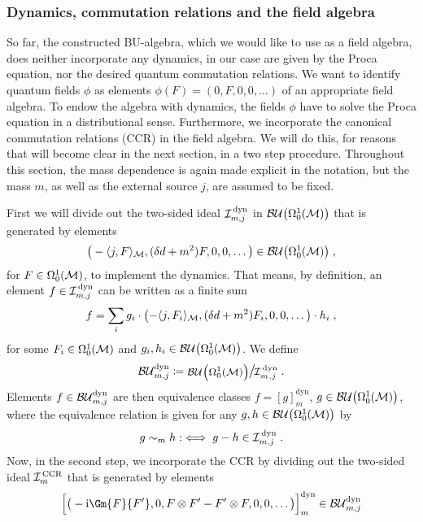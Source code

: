 \subsubsection{Dynamics, commutation relations and the field algebra}
So far, the constructed BU-algebra, which we would like to use as a field algebra, does neither incorporate any dynamics, in our case are given by the Proca equation, nor the desired quantum commutation relations. We want to identify quantum fields $\phi$ as elements $\phi(F) = (0, F, 0, 0, \dots)$ of an appropriate field algebra. To endow the algebra with dynamics,  the fields $\phi$ have to solve the Proca equation in a distributional sense. Furthermore, we incorporate the canonical commutation relations (CCR) in the field algebra. We will do this, for reasons that will become clear in the next section, in a two step procedure. Throughout this section, the mass dependence is again made explicit in the notation, but the mass $m$, as well as the external source $j$, are assumed to be fixed.\par
First we will divide out the two-sided ideal $\mathcal{I}_{m,j}^\text{\,dyn}$ in ${\mathcal{BU}\big(\Omega^1_0(\mathcal{M})\big)}$ that is generated by elements
\begin{align}
\big(-\langle j, F \rangle_{\mathcal{M}}, (\delta d + m^2)F,0,0,\dots\big) \in {\mathcal{BU}\big(\Omega^1_0(\ensuremath{\mathcal{M}})\big)}\;,
\end{align}
for $F \in \Omega^1_0(\mathcal{M})$, to implement the dynamics. That means, by definition, an element $f \in \mathcal{I}_{m,j}^\text{\,dyn}$ can be written as a finite sum
\begin{align}
f = \sum_i g_i \cdot \left(-\langle j, F_i \rangle_{\mathcal{M}}, (\delta d + m^2)F_i,0,0,\dots\right) \cdot h_i \;,
\end{align}
for some $F_i \in \Omega^1_0(\mathcal{M})$ and $g_i, h_i \in {\mathcal{BU}\big(\Omega^1_0(\ensuremath{\mathcal{M}})\big)}$. We define
\begin{align}
	\BUmjdyn \coloneqq {\Quotientscale{\BUOmega}{\IMJDYN}} \formspace.
\end{align}
Elements $f \in \mathcal{BU}_{m,j}^\text{dyn}$ are then equivalence classes $ f = \left[ g \right]_m^\text{dyn}$, $g \in {\mathcal{BU}\big(\Omega^1_0(\ensuremath{\mathcal{M}})\big)}$, where the equivalence relation is given for any $g,h \in {\mathcal{BU}\big(\Omega^1_0(\ensuremath{\mathcal{M}})\big)}$ by
\begin{align}
g \sim_m h :\iff g-h \in \mathcal{I}_{m,j}^\text{\,dyn} \;.
\end{align}
Now, in the second step, we incorporate the CCR by dividing out the two-sided ideal $\mathcal{I}_m^\text{\,CCR}$ that is generated by elements
\begin{align}
\Big[ \big(-\i \Gm{F}{F'}, 0 , F \otimes F' - F' \otimes F, 0 , 0 , \dots\big) \Big]_m^\text{dyn} \in \BUmjdyn
\end{align}
